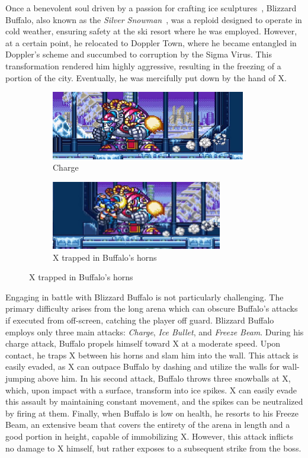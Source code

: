 Once a benevolent soul driven by a passion for crafting ice sculptures~\cite{Xcoll1:Manual_X3}, Blizzard Buffalo, also known as the \textit{Silver Snowman}~\cite{book:MMX_Complete_art}, was a reploid designed to operate in cold weather, ensuring safety at the ski resort where he was employed\cite{wayback:X3_resources,wiki:Blizzard_buffalo}. However, at a certain point, he relocated to Doppler Town, where he became entangled in Doppler's scheme and succumbed to corruption by the Sigma Virus. This transformation rendered him highly aggressive, resulting in the freezing of a portion of the city. Eventually, he was mercifully put down by the hand of X.
\begin{figure}[htp]
	\centering
	\begin{subfigure}{\linewidth}
		\centering
		\includegraphics[height=3cm]{figures/X3/Blizzard_buffalo/Buffalo_charge.jpg}
		\caption{Charge}
	\end{subfigure}
	\begin{subfigure}{\linewidth}
		\centering
		\includegraphics[height=3cm]{figures/X3/Blizzard_buffalo/Buffalo_charge_2.jpg}
		\caption{X trapped in Buffalo's horns}
	\end{subfigure}
\end{figure}

Engaging in battle with Blizzard Buffalo is not particularly challenging. The primary difficulty arises from the long arena which can obscure Buffalo's attacks if executed from off-screen, catching the player off guard. Blizzard Buffalo employs only three main attacks: \emph{Charge}, \emph{Ice Bullet}, and \emph{Freeze Beam}. During his charge attack, Buffalo propels himself toward X at a moderate speed. Upon contact, he traps X between his horns and slam him into the wall. This attack is easily evaded, as X can outpace Buffalo by dashing and utilize the walls for wall-jumping above him. In his second attack, Buffalo throws three snowballs at X, which, upon impact with a surface, transform into ice spikes. X can easily evade this assault by maintaining constant movement, and the spikes can be neutralized by firing at them. Finally, when Buffalo is low on health, he resorts to his Freeze Beam, an extensive beam that covers the entirety of the arena in length and a good portion in height, capable of immobilizing X. However, this attack inflicts no damage to X himself, but rather exposes to a subsequent strike from the boss.


